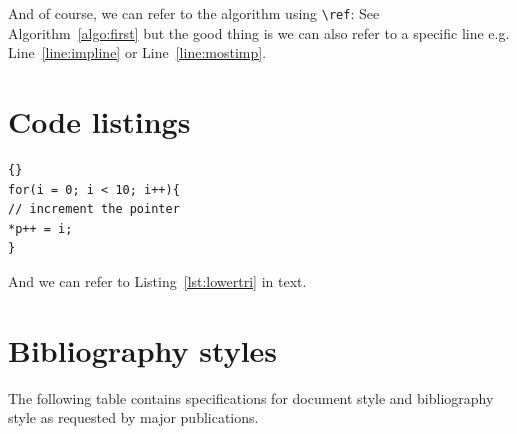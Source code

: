 \documentclass[twocolumn]{article}
\begin{document}
And of course, we can refer to the algorithm using \verb|\ref|: See Algorithm~\ref{algo:first} but the good thing is we can also refer to a specific line e.g. Line~\ref{line:impline} or Line~\ref{line:mostimp}.


\section{Code listings}

\lstset{language=c++, float=H}
\lstset{caption=Some C++ Code}
\begin{lstlisting}[frame=single, label=lst:lowertri]{}
for(i = 0; i < 10; i++){
// increment the pointer
*p++ = i;
}
\end{lstlisting}



%


And we can refer to Listing~\ref{lst:lowertri} in text.



\section{Bibliography styles} 

The following table contains specifications for document style and bibliography style as requested by major publications.
\end{document}
